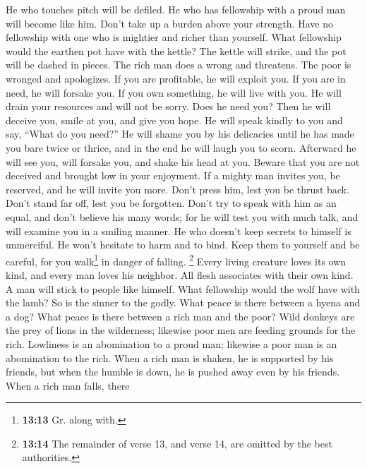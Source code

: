  He who touches pitch will be defiled. He who has
fellowship with a proud man will become like him.  Don't
take up a burden above your strength. Have no fellowship with one who is
mightier and richer than yourself. What fellowship would the earthen pot
have with the kettle? The kettle will strike, and the pot will be dashed
in pieces.  The rich man does a wrong and threatens. The
poor is wronged and apologizes.  If you are profitable, he
will exploit you. If you are in need, he will forsake you.
 If you own something, he will live with you. He will
drain your resources and will not be sorry.  Does he need
you? Then he will deceive you, smile at you, and give you hope. He will
speak kindly to you and say, ``What do you need?''  He
will shame you by his delicacies until he has made you bare twice or
thrice, and in the end he will laugh you to scorn. Afterward he will see
you, will forsake you, and shake his head at you.  Beware
that you are not deceived and brought low in your enjoyment.
 If a mighty man invites you, be reserved, and he will
invite you more.  Don't press him, lest you be thrust
back. Don't stand far off, lest you be forgotten.  Don't
try to speak with him as an equal, and don't believe his many words; for
he will test you with much talk, and will examine you in a smiling
manner.  He who doesn't keep secrets to himself is
unmerciful. He won't hesitate to harm and to bind.  Keep
them to yourself and be careful, for you walk\footnote{\textbf{13:13}
  Gr. along with.} in danger of falling.  \footnote{\textbf{13:14}
  The remainder of verse 13, and verse 14, are omitted by the best
  authorities.}  Every living creature loves its own
kind, and every man loves his neighbor.  All flesh
associates with their own kind. A man will stick to people like himself.
 What fellowship would the wolf have with the lamb? So is
the sinner to the godly.  What peace is there between a
hyena and a dog? What peace is there between a rich man and the poor?
 Wild donkeys are the prey of lions in the wilderness;
likewise poor men are feeding grounds for the rich. 
Lowliness is an abomination to a proud man; likewise a poor man is an
abomination to the rich.  When a rich man is shaken, he
is supported by his friends, but when the humble is down, he is pushed
away even by his friends.  When a rich man falls, there
